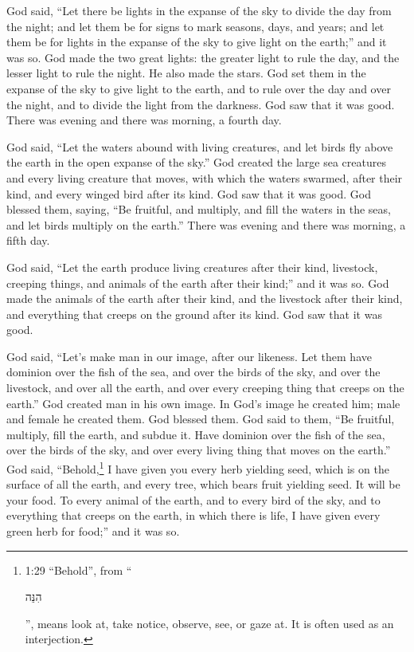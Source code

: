 \myverse{}God said, “Let there be lights in the expanse of the sky to divide the day from the night; and let them be for signs to mark seasons, days, and years; \myverse{}and let them be for lights in the expanse of the sky to give light on the earth;” and it was so. \myverse{}God made the two great lights: the greater light to rule the day, and the lesser light to rule the night. He also made the stars. \myverse{}God set them in the expanse of the sky to give light to the earth, \myverse{}and to rule over the day and over the night, and to divide the light from the darkness. God saw that it was good. \myverse{}There was evening and there was morning, a fourth day.

\myverse{}God said, “Let the waters abound with living creatures, and let birds fly above the earth in the open expanse of the sky.” \myverse{}God created the large sea creatures and every living creature that moves, with which the waters swarmed, after their kind, and every winged bird after its kind. God saw that it was good. \myverse{}God blessed them, saying, “Be fruitful, and multiply, and fill the waters in the seas, and let birds multiply on the earth.” \myverse{}There was evening and there was morning, a fifth day.

\myverse{}God said, “Let the earth produce living creatures after their kind, livestock, creeping things, and animals of the earth after their kind;” and it was so. \myverse{}God made the animals of the earth after their kind, and the livestock after their kind, and everything that creeps on the ground after its kind. God saw that it was good.

\myverse{}God said, “Let’s make man in our image, after our likeness. Let them have dominion over the fish of the sea, and over the birds of the sky, and over the livestock, and over all the earth, and over every creeping thing that creeps on the earth.” \myverse{}God created man in his own image. In God’s image he created him; male and female he created them. \myverse{} God blessed them. God said to them, “Be fruitful, multiply, fill the earth, and subdue it. Have dominion over the fish of the sea, over the birds of the sky, and over every living thing that moves on the earth.” \myverse{}God said, “Behold,\footnote{1:29 “Behold”, from “\begin{otherlanguage}{hebrew}הִנֵּה\end{otherlanguage}”, means look at, take notice, observe, see, or gaze at. It is often used as an interjection.} I have given you every herb yielding seed, which is on the surface of all the earth, and every tree, which bears fruit yielding seed. It will be your food. \myverse{}To every animal of the earth, and to every bird of the sky, and to everything that creeps on the earth, in which there is life, I have given every green herb for food;” and it was so.

